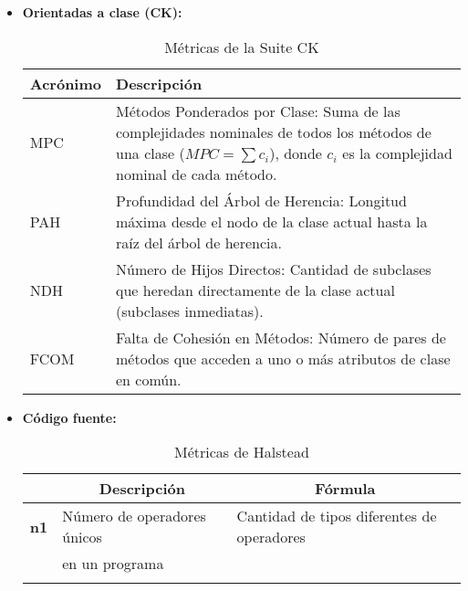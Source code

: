 \begin{itemize}
        \item \textbf{Orientadas a clase (CK):}
        \begin{table}[!ht]
            \centering
            \caption{Métricas de la Suite CK}
            \label{tab:ck_metrics}
            \begin{tabularx}{\linewidth}{lX}
                \toprule
                \textbf{Acrónimo} & \textbf{Descripción}                                                                                                                                                          \\
                \midrule
                MPC               & Métodos Ponderados por Clase: Suma de las complejidades nominales de todos los métodos de una clase ($MPC = \sum c_i$), donde $c_i$ es la complejidad nominal de cada método. \\
                \addlinespace[0.3cm]
                PAH               & Profundidad del Árbol de Herencia: Longitud máxima desde el nodo de la clase actual hasta la raíz del árbol de herencia.                                                      \\
                \addlinespace[0.3cm]
                NDH               & Número de Hijos Directos: Cantidad de subclases que heredan directamente de la clase actual (subclases inmediatas).                                                           \\
                \addlinespace[0.3cm]
                FCOM              & Falta de Cohesión en Métodos: Número de pares de métodos que acceden a uno o más atributos de clase en común.                                                                 \\
                \bottomrule
            \end{tabularx}
        \end{table}

        \item \textbf{Código fuente:}
        \begin{itemize}
            \begin{table}[!ht]
                \centering
                \caption{Métricas de Halstead}
                \label{tab:halstead_metrics}
                \begin{tabular}{>{\bfseries}l l l}
                    \toprule
                    \multicolumn{1}{c}{\textbf{Símbolo}} &
                    \multicolumn{1}{c}{\textbf{Descripción}} &
                    \multicolumn{1}{c}{\textbf{Fórmula}} \\
                    \midrule
                    n1 & Número de operadores únicos    & Cantidad de tipos diferentes de operadores        \\
                    & en un programa                 &                                                   \\
                    \addlinespace


\end{tabular}
\end{table}
\end{itemize}
\end{itemize}
